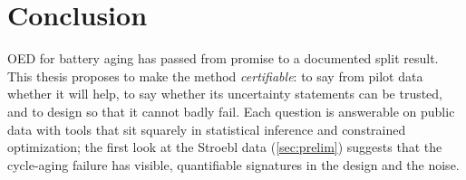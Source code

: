 \documentclass[11pt,letterpaper]{article}
\begin{document}
\section{Conclusion}
OED for battery aging has passed from promise to a documented split result. This thesis proposes to make the method \emph{certifiable}: to say from pilot data whether it will help, to say whether its uncertainty statements can be trusted, and to design so that it cannot badly fail. Each question is answerable on public data with tools that sit squarely in statistical inference and constrained optimization; the first look at the Stroebl data (\cref{sec:prelim}) suggests that the cycle-aging failure has visible, quantifiable signatures in the design and the noise.

\newpage
{}
\end{document}
